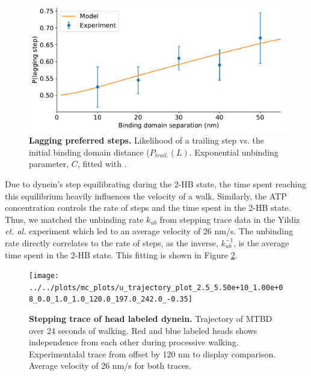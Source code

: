 \documentclass[9pt,twocolumn,twoside]{article}
\begin{document}
\begin{figure}[tbhp]
	\centering
	\includegraphics[width=\linewidth]{../../plots/mc_plots/prob_lagging_vs_init_L_-0.35}
	\caption[Lagging preferred steps]{\textbf{Lagging preferred steps.} Likelihood of a trailing step vs. the initial binding domain distance ($P_{trail.}(L)$. Exponential unbinding parameter, $C$, fitted with \cite{Dewitt2012}.}
	\label{fig:ProbLagPlot}
\end{figure}




Due to dynein's step equilibrating during the 2-HB state, the time spent reaching this equilibrium heavily influences the velocity of a walk. Similarly, the ATP concentration controls the rate of steps and the time spent in the 2-HB state. Thus, we matched the unbinding rate $k_{ub}$ from stepping trace data in the Yildiz \textit{et. al.} experiment which led to an average velocity of 26 nm/s. The unbinding rate directly correlates to the rate of steps, as the inverse, $k_{ub}^{-1}$, is the average time spent in the 2-HB state. This fitting is shown in Figure \ref{fig:TrajPlot}.


\begin{figure}[ht]
	\centering
	\texttt{[image: ../../plots/mc\_plots/u\_trajectory\_plot\_2.5\_5.50e+10\_1.00e+08\_0.0\_1.0\_1.0\_120.0\_197.0\_242.0\_-0.35]}
	\caption[Stepping trace of head labeled dynein]{\textbf{Stepping trace of head labeled dynein.} Trajectory of MTBD over 24 seconds of walking. Red and blue labeled heads shows independence from each other during processive walking. Experimentalal trace from \cite{Dewitt2012} offset by 120 nm to display comparison. Average velocity of 26 nm/s for both traces.}
	\label{fig:TrajPlot}
\end{figure}
\end{document}
